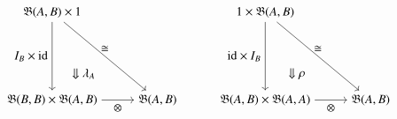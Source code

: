 \documentclass[12pt]{ociamthesis}
\newcommand{\id}{\mathrm{id}}
\begin{document}
\begin{equation*}
\begin{aligned}
\begin{tikzpicture}[yscale=2.5, xscale=3]
\node (A) at (0,1){$\fB(A,B) \times 1$};
\node (B) at (1,0) {$\fB(A,B)$};
\node (D) at (0,0) {$\fB(B,B) \times \fB(A,B)$};
\node (C) at (.3,.3){$\Downarrow \lambda_{A}$};
\draw[->] (A) to node[above]{$\iso$} (B);
\draw[->] (D) to node[below]{$\otimes$} (B);
\draw[->] (A) to node[left]{$  I_B \times \id$} (D);
\end{tikzpicture}
\hspace{1cm}
\begin{tikzpicture}[yscale=2.5, xscale=3]
\node (A) at (0,1){$1 \times \fB(A,B)$};
\node (B) at (1,0) {$\fB(A,B)$};
\node (D) at (0,0) {$\fB(A,B) \times \fB(A,A)$};
\node (C) at (.3,.3){$\Downarrow\rho$};
\draw[->] (A) to node[above]{$\iso$} (B);
\draw[->] (D) to node[below]{$\otimes$} (B);
\draw[->] (A) to node[left]{$\id \times I_B$} (D);
\end{tikzpicture}
\end{aligned}
\end{equation*}
\end{document}
